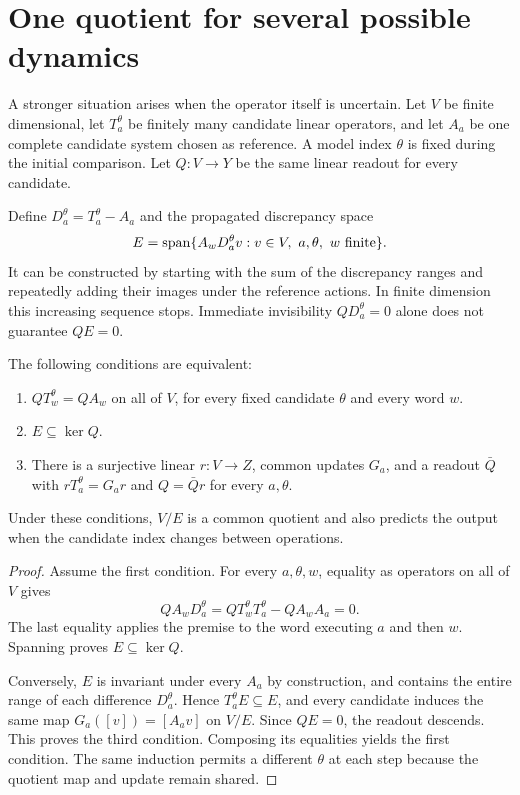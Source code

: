 \section{One quotient for several possible dynamics}
A stronger situation arises when the operator itself is uncertain. Let $V$ be finite dimensional, let $T_a^\theta$ be finitely many candidate linear operators, and let $A_a$ be one complete candidate system chosen as reference. A model index $\theta$ is fixed during the initial comparison. Let $Q:V\to Y$ be the same linear readout for every candidate.

Define $D_a^\theta=T_a^\theta-A_a$ and the propagated discrepancy space
\[
E=\Span\{A_wD_a^\theta v: v\in V,\ a,\theta,\ w\text{ finite}\}.
\]
It can be constructed by starting with the sum of the discrepancy ranges and repeatedly adding their images under the reference actions. In finite dimension this increasing sequence stops. Immediate invisibility $QD_a^\theta=0$ alone does not guarantee $QE=0$.

\begin{theorem}\label{r:common}
The following conditions are equivalent:
\begin{enumerate}
\item $QT_w^\theta=QA_w$ on all of $V$, for every fixed candidate $\theta$ and every word $w$.
\item $E\subseteq\ker Q$.
\item There is a surjective linear $r:V\to Z$, common updates $G_a$, and a readout $\bar Q$ with $rT_a^\theta=G_ar$ and $Q=\bar Qr$ for every $a,\theta$.
\end{enumerate}
Under these conditions, $V/E$ is a common quotient and also predicts the output when the candidate index changes between operations.
\end{theorem}
\begin{proof}
Assume the first condition. For every $a,\theta,w$, equality as operators on all of $V$ gives
\[
QA_wD_a^\theta=QT_w^\theta T_a^\theta-QA_wA_a=0.
\]
The last equality applies the premise to the word executing $a$ and then $w$. Spanning proves $E\subseteq\ker Q$.

Conversely, $E$ is invariant under every $A_a$ by construction, and contains the entire range of each difference $D_a^\theta$. Hence $T_a^\theta E\subseteq E$, and every candidate induces the same map $G_a([v])=[A_av]$ on $V/E$. Since $QE=0$, the readout descends. This proves the third condition. Composing its equalities yields the first condition. The same induction permits a different $\theta$ at each step because the quotient map and update remain shared.
\end{proof}

